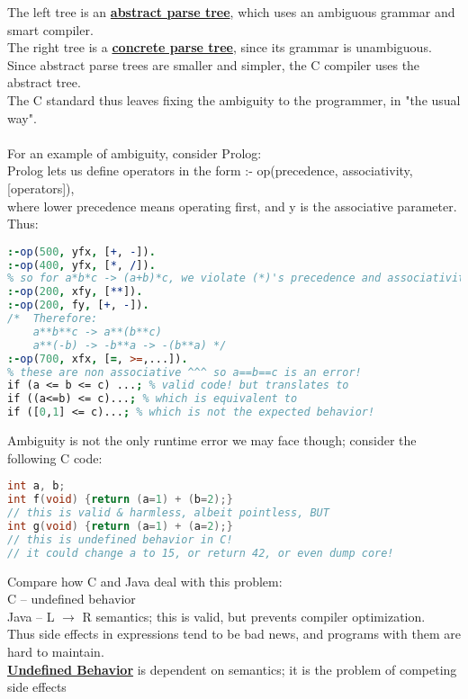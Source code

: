 \documentclass[../../lecture_notes.tex]{subfiles}
\begin{document}
\noindent The left tree is an \textbf{\underline{abstract parse tree}}, 
	which uses an ambiguous grammar and smart compiler.\\
The right tree is a \textbf{\underline{concrete parse tree}}, since its grammar is unambiguous.\\
Since abstract parse trees are smaller and simpler, the C compiler uses the abstract tree.\\
The C standard thus leaves fixing the ambiguity to the programmer, in "the usual way".\\
\\
For an example of ambiguity, consider Prolog:\\
Prolog lets us define operators in the form :- op(precedence, associativity, [operators]),\\
	where lower precedence means operating first, and y is the associative parameter.
Thus: \begin{lstlisting}[language=Prolog]
:-op(500, yfx, [+, -]).
:-op(400, yfx, [*, /]).
% so for a*b*c -> (a+b)*c, we violate (*)'s precedence and associativity! 
:-op(200, xfy, [**]).
:-op(200, fy, [+, -]).
/*	Therefore: 
	a**b**c -> a**(b**c)
	a**(-b) -> -b**a -> -(b**a) */
:-op(700, xfx, [=, >=,...]).
% these are non associative ^^^ so a==b==c is an error!
if (a <= b <= c) ...; % valid code! but translates to
if ((a<=b) <= c)...; % which is equivalent to
if ([0,1] <= c)...; % which is not the expected behavior!
\end{lstlisting}
Ambiguity is not the only runtime error we may face though; consider the following C code:
\begin{lstlisting}[language=C]
int a, b;
int f(void) {return (a=1) + (b=2);}
// this is valid & harmless, albeit pointless, BUT
int g(void) {return (a=1) + (a=2);}
// this is undefined behavior in C!
// it could change a to 15, or return 42, or even dump core!
\end{lstlisting}
Compare how C and Java deal with this problem:\\
	\indent C -- undefined behavior\\
	\indent Java -- L $\to$ R semantics; this is valid, but prevents compiler optimization.\\
Thus side effects in expressions tend to be bad news, and programs with them are hard to maintain.\\
\textbf{\underline{Undefined Behavior}} is dependent on semantics; it is the problem of competing side effects\\
\\
\end{document}

